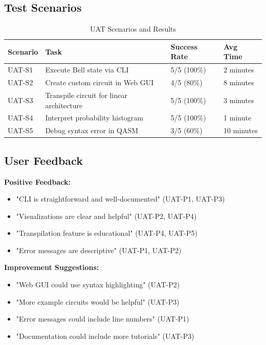 \subsection{Test Scenarios}

\begin{table}[h]
\centering
\caption{UAT Scenarios and Results}
\begin{tabular}{|p{1.5cm}|p{5cm}|p{2cm}|p{3cm}|}
\hline
\textbf{Scenario} & \textbf{Task} & \textbf{Success Rate} & \textbf{Avg Time} \\
\hline
UAT-S1 & Execute Bell state via CLI & 5/5 (100\%) & 2 minutes \\
\hline
UAT-S2 & Create custom circuit in Web GUI & 4/5 (80\%) & 8 minutes \\
\hline
UAT-S3 & Transpile circuit for linear architecture & 5/5 (100\%) & 3 minutes \\
\hline
UAT-S4 & Interpret probability histogram & 5/5 (100\%) & 1 minute \\
\hline
UAT-S5 & Debug syntax error in QASM & 3/5 (60\%) & 10 minutes \\
\hline
\end{tabular}
\end{table}

\subsection{User Feedback}

\textbf{Positive Feedback:}
\begin{itemize}
\item "CLI is straightforward and well-documented" (UAT-P1, UAT-P3)
\item "Visualizations are clear and helpful" (UAT-P2, UAT-P4)
\item "Transpilation feature is educational" (UAT-P4, UAT-P5)
\item "Error messages are descriptive" (UAT-P1, UAT-P2)
\end{itemize}

\textbf{Improvement Suggestions:}
\begin{itemize}
\item "Web GUI could use syntax highlighting" (UAT-P2)
\item "More example circuits would be helpful" (UAT-P3)
\item "Error messages could include line numbers" (UAT-P1)
\item "Documentation could include more tutorials" (UAT-P3)
\end{itemize}

